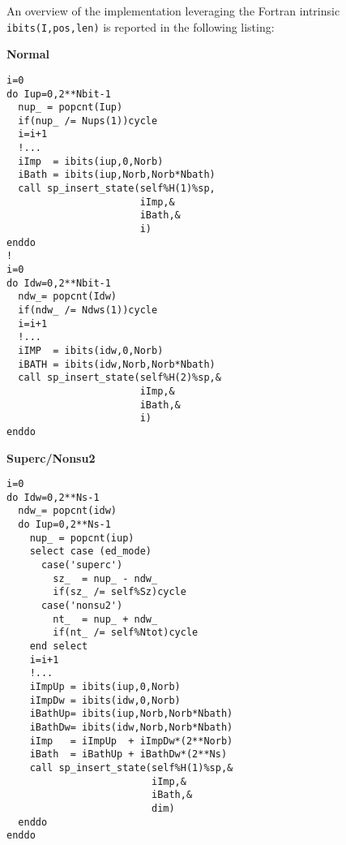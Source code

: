 \documentclass[edipack_sp.tex]{subfiles}
\begin{document}
An overview of the implementation leveraging the Fortran intrinsic {\tt ibits(I,pos,len)} is reported in the following listing:
\begin{center}
\begin{minipage}[t]{0.49\linewidth}
\textbf{Normal}
\begin{lstlisting}[style=fstyle,frame=leftline,numbers=none,basicstyle={\ttfamily\scriptsize}]
i=0
do Iup=0,2**Nbit-1     
  nup_ = popcnt(Iup) 
  if(nup_ /= Nups(1))cycle
  i=i+1 
  !...
  iImp  = ibits(iup,0,Norb)
  iBath = ibits(iup,Norb,Norb*Nbath)
  call sp_insert_state(self%H(1)%sp,
                       iImp,&
                       iBath,&
                       i)
enddo
!
i=0
do Idw=0,2**Nbit-1
  ndw_= popcnt(Idw)
  if(ndw_ /= Ndws(1))cycle
  i=i+1 
  !...
  iIMP  = ibits(idw,0,Norb)
  iBATH = ibits(idw,Norb,Norb*Nbath)
  call sp_insert_state(self%H(2)%sp,&
                       iImp,&
                       iBath,&
                       i) 
enddo
\end{lstlisting}
\end{minipage}
%
\begin{minipage}[t]{0.49\linewidth}
\textbf{Superc/Nonsu2}
\begin{lstlisting}[style=fstyle,frame=leftline,numbers=none,basicstyle={\ttfamily\scriptsize}]
i=0
do Idw=0,2**Ns-1
  ndw_= popcnt(idw)
  do Iup=0,2**Ns-1
    nup_ = popcnt(iup)
    select case (ed_mode)
      case('superc') 
        sz_  = nup_ - ndw_
        if(sz_ /= self%Sz)cycle
      case('nonsu2') 
        nt_  = nup_ + ndw_
        if(nt_ /= self%Ntot)cycle 
    end select
    i=i+1 
    !...
    iImpUp = ibits(iup,0,Norb)
    iImpDw = ibits(idw,0,Norb)
    iBathUp= ibits(iup,Norb,Norb*Nbath)
    iBathDw= ibits(idw,Norb,Norb*Nbath)
    iImp   = iImpUp  + iImpDw*(2**Norb)
    iBath  = iBathUp + iBathDw*(2**Ns)
    call sp_insert_state(self%H(1)%sp,&
                         iImp,&
                         iBath,&
                         dim)
  enddo
enddo
\end{lstlisting}
\end{minipage}
\end{center}


  

  
\end{document}
